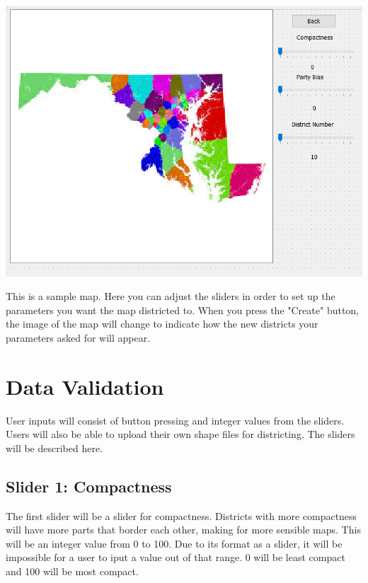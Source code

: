 \documentclass{article}
\begin{document}
\vspace{10mm}
	
\hspace*{5mm}   
\includegraphics[scale=.7]{mapwin.png}

\vspace{5mm}

This is a sample map.  Here you can adjust the sliders in order to set up the parameters you want the map districted to.  When you press the "Create" button, the image of the map will change to indicate how the new districts your parameters asked for will appear.
\section{Data Validation}
User inputs will consist of button pressing and integer values from the sliders.  Users will also be able to upload their own shape files for districting.  The sliders will be described here.



\subsection{Slider 1: Compactness}

The first slider will be a slider for compactness.  Districts with more compactness will have more parts that border each other, making for more sensible maps.  This will be an integer value from 0 to 100.  Due to its format as a slider, it will be impossible for a user to iput a value out of that range.  0 will be least compact and 100 will be most compact.
\end{document}

